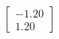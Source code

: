 \documentclass[preview]{standalone}
\begin{document}
\begin{align*}
\begin{bmatrix} -1.20 \\ 1.20 \end{bmatrix}
\end{align*}
\end{document}

